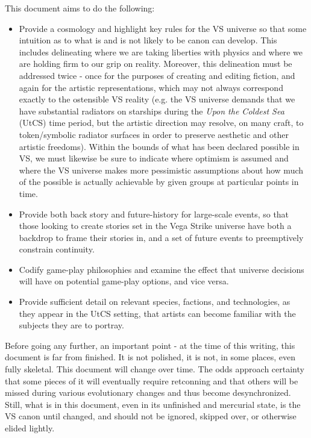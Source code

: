 This document aims to do the following:
\begin{itemize}
\item Provide a cosmology and highlight key rules for the VS universe
   so that some intuition as to what is and is not likely to be canon
   can develop. This includes delineating where we are taking
   liberties with physics and where we are holding firm to our grip on
   reality. Moreover, this delineation must be addressed twice - once
   for the purposes of creating and editing fiction, and again for the
   artistic representations, which may not always correspond exactly
   to the ostensible VS reality (e.g. the VS universe demands that we
   have substantial radiators on starships during the {\it Upon the
   Coldest Sea} (UtCS) time period, but the artistic direction may resolve,
   on many craft, to token/symbolic radiator surfaces in order to preserve
   aesthetic and other artistic freedoms). Within the bounds of what
   has been declared possible in VS, we must likewise be sure to
   indicate where optimism is assumed and where the VS universe makes
   more pessimistic assumptions about how much of the possible is
   actually achievable by given groups at particular points in time.
\item Provide both back story and future-history for large-scale
  events, so that those looking to create stories set in the Vega
  Strike universe have both a backdrop to frame their stories in, and
  a set of future events to preemptively constrain continuity.
\item Codify game-play philosophies and examine the effect that universe decisions will have on potential game-play options, and vice versa.
\item Provide sufficient detail on relevant species, factions, and
  technologies, as they appear in the UtCS setting, that artists can
  become familiar with the subjects they are to portray.
\end{itemize}

Before going any further, an important point - at the time of this
writing, this document is far from finished. It is not polished, it is
not, in some places, even fully skeletal. This document will change
over time. The odds approach certainty that some pieces of it will
eventually require retconning and that others will be missed during various
evolutionary changes and thus become
desynchronized. Still, what is in this document, even in its
unfinished and mercurial state, is the VS canon until changed, and
should not be ignored, skipped over, or otherwise elided lightly.

